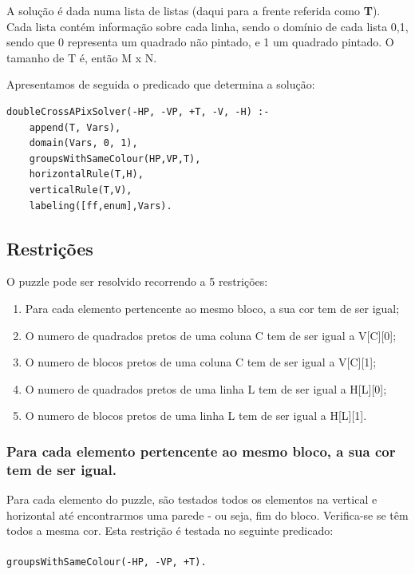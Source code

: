 \documentclass[runningheads,a4paper]{llncs}
\begin{document}
A solução é dada numa lista de listas (daqui para a frente referida como \textbf{T}). Cada lista contém informação sobre cada linha, sendo o domínio de cada lista {0,1}, sendo que 0 representa um quadrado não pintado, e 1 um quadrado pintado. O tamanho de T é, então M x N.

Apresentamos de seguida o predicado que determina a solução:

\begin{lstlisting}
doubleCrossAPixSolver(-HP, -VP, +T, -V, -H) :-	
	append(T, Vars),
	domain(Vars, 0, 1),
	groupsWithSameColour(HP,VP,T),
	horizontalRule(T,H),
	verticalRule(T,V),
	labeling([ff,enum],Vars).
\end{lstlisting}

\subsection{Restrições}

O puzzle pode ser resolvido recorrendo a 5 restrições:

\begin{enumerate}
\item Para cada elemento pertencente ao mesmo bloco, a sua cor tem de ser igual;
\item O numero de quadrados pretos de uma coluna C tem de ser igual a V[C][0];
\item O numero de blocos pretos de uma coluna C tem de ser igual a V[C][1];
\item O numero de quadrados pretos de uma linha L tem de ser igual a H[L][0];
\item O numero de blocos pretos de uma linha L tem de ser igual a H[L][1].
\end{enumerate}

\subsubsection{Para cada elemento pertencente ao mesmo bloco, a sua cor tem de ser igual.}

Para cada elemento do puzzle, são testados todos os elementos na vertical e horizontal até encontrarmos uma parede - ou seja, fim do bloco. Verifica-se se têm todos a mesma cor.
Esta restrição é testada no seguinte predicado:
\paragraph{}
\begin{lstlisting}
groupsWithSameColour(-HP, -VP, +T).
\end{lstlisting}
\end{document}
